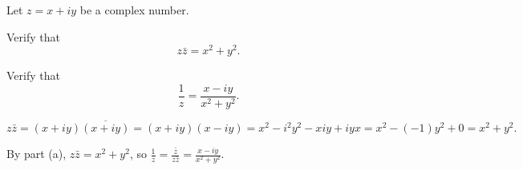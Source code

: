\documentclass{ximera}
\begin{document}
\begin{exercise} \label{YZ_2.5_proof}
Let $z=x+iy$ be a complex number. 

\begin{enumeratea}
\item Verify that 
\begin{equation}
    z\bar{z}=x^2+y^2. \label{YZ_2.5_E1}
\end{equation}


\item Verify that 
\begin{equation}
    \frac{1}{z}=\frac{x-iy}{x^2+y^2}. \label{YZ_2.5_E2}
\end{equation}
\end{enumeratea}

\begin{solution}
\soln 
\begin{enumeratea}
\item $z\bar{z}=(x+iy)\overline{(x+iy)}=(x+iy)(x-iy)=x^2-i^2y^2-x iy+iyx=x^2-(-1)y^2+0=x^2+y^2.$

\item By part (a), $z\bar{z}=x^2+y^2$, so $\frac{1}{z}=\frac{\bar{z}}{z\bar{z}}=\frac{x-iy}{x^2+y^2}$.
\end{enumeratea}
\end{solution}
\end{exercise}
\end{document}
